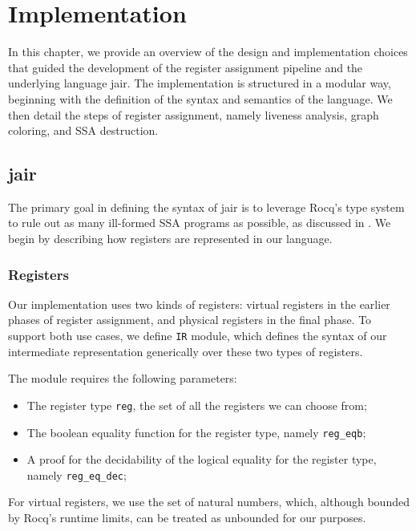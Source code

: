 
\chapter{Implementation}
\label{cha:implementation}

In this chapter, we provide an overview of the design and implementation choices that guided the development of the register assignment pipeline and the underlying language \gls{jair}. The implementation is structured in a modular way, beginning with the definition of the syntax and semantics of the language. We then detail the steps of register assignment, namely liveness analysis, graph coloring, and SSA destruction.

\section{\gls{jair}}
\label{sec:jair}

The primary goal in defining the syntax of \gls{jair} is to leverage Rocq’s type system to rule out as many ill-formed SSA programs as possible, as discussed in . We begin by describing how registers are represented in our language.

\subsection{Registers}

Our implementation uses two kinds of registers: virtual registers in the earlier phases of register assignment, and physical registers in the final phase. To support both use cases, we define \texttt{IR} module, which defines the syntax of our intermediate representation generically over these two types of registers.

The module requires the following parameters:
\begin{itemize}
    \item The register type \texttt{reg}, the set of all the registers we can choose from;
    \item The boolean equality function for the register type, namely \texttt{reg\_eqb};
    \item A proof for the decidability of the logical equality for the register type, namely \texttt{reg\_eq\_dec};
\end{itemize}

For virtual registers, we use the set of natural numbers, which, although bounded by Rocq's runtime limits, can be treated as unbounded for our purposes.

